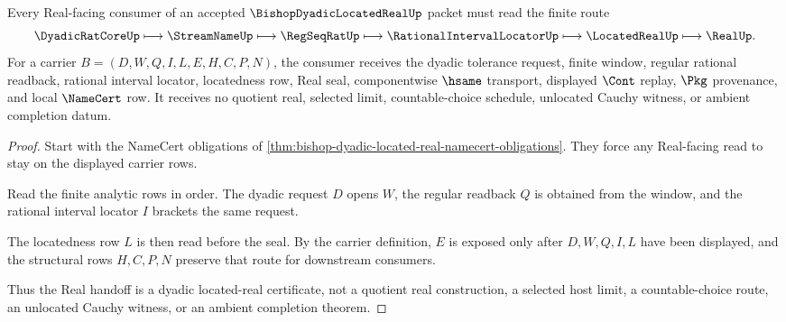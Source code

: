 \begin{theorem}
\label{thm:bishop-dyadic-located-real-real-handoff}
Every Real-facing consumer of an accepted $\BishopDyadicLocatedRealUp$ packet must read the finite route
$$
\DyadicRatCoreUp \longmapsto \StreamNameUp \longmapsto \RegSeqRatUp \longmapsto \RationalIntervalLocatorUp \longmapsto \LocatedRealUp \longmapsto \RealUp .
$$
For a carrier $B=(D,W,Q,I,L,E,H,C,P,N)$, the consumer receives the dyadic tolerance request, finite window, regular rational readback, rational interval locator, locatedness row, Real seal, componentwise $\hsame$ transport, displayed $\Cont$ replay, $\Pkg$ provenance, and local $\NameCert$ row. It receives no quotient real, selected limit, countable-choice schedule, unlocated Cauchy witness, or ambient completion datum.
\end{theorem}
\begin{proof}
Start with the NameCert obligations of \autoref{thm:bishop-dyadic-located-real-namecert-obligations}. They force any Real-facing read to stay on the displayed carrier rows.

Read the finite analytic rows in order. The dyadic request $D$ opens $W$, the regular readback $Q$ is obtained from the window, and the rational interval locator $I$ brackets the same request.

The locatedness row $L$ is then read before the seal. By the carrier definition, $E$ is exposed only after $D,W,Q,I,L$ have been displayed, and the structural rows $H,C,P,N$ preserve that route for downstream consumers.

Thus the Real handoff is a dyadic located-real certificate, not a quotient real construction, a selected host limit, a countable-choice route, an unlocated Cauchy witness, or an ambient completion theorem.
\end{proof}



